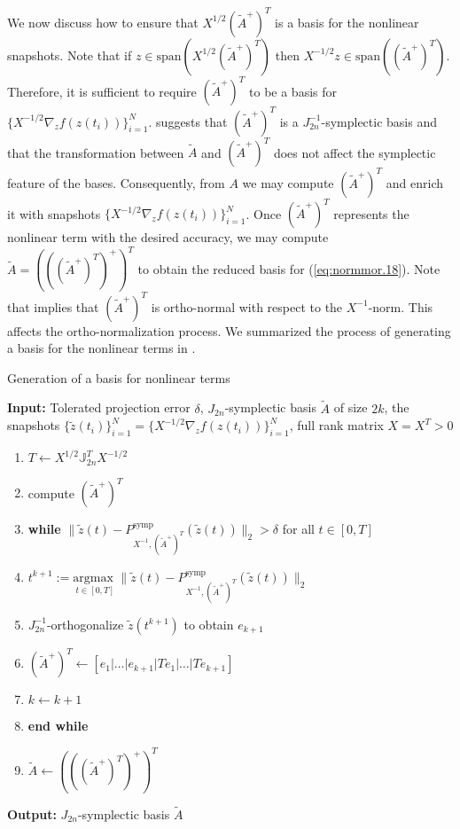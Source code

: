 We now discuss how to ensure that $X^{1/2} (\tilde A^+)^T$ is a basis for the nonlinear snapshots. Note that if $z \in \text{span}\left(X^{1/2} (\tilde A^+)^T\right)$ then $X^{-1/2} z \in \text{span}\left(( \tilde A^+)^T \right)$. Therefore, it is sufficient to require $(\tilde A^+)^T$ to be a basis for $\{X^{-1/2} \nabla_z f(z(t_i))\}_{i=1}^N$.  suggests that $(\tilde A^+)^T$ is a $J_{2n}^{-1}$-symplectic basis and that the transformation between $\tilde A$ and $(\tilde A^+)^T $ does not affect the symplectic feature of the bases. Consequently, from $A$ we may compute $(\tilde A^+)^T$ and enrich it with snapshots $\{X^{-1/2} \nabla_z f(z(t_i))\}_{i=1}^N$. Once $(\tilde A^+)^T$ represents the nonlinear term with the desired accuracy, we may compute $\tilde A= \left( \left( ( \tilde A^+ )^T \right)^+ \right)^T$ to obtain the reduced basis for (\ref{eq:normmor.18}). Note that  implies that $(\tilde A^+)^T$ is ortho-normal with respect to the $X^{-1}$-norm. This affects the ortho-normalization process. We summarized the process of generating a basis for the nonlinear terms in .

\begin{algorithm} 
\caption{Generation of a basis for nonlinear terms} \label{alg:3}
{\bf Input:} Tolerated projection error $\delta$, $J_{2n}$-symplectic basis $\tilde A$ of size $2k$, the snapshots $\{\tilde z(t_i)\}_{i=1}^{N} = \{X^{-1/2} \nabla_zf(z(t_i))\}_{i=1}^{N}$, full rank matrix $X=X^T>0$
\begin{enumerate}
\item $T \leftarrow X^{1/2}\mathbb J_{2n}^T X^{-1/2}$
\item compute $(\tilde A^+)^T$
\item \textbf{while} $\| \tilde z(t) - P^\text{symp}_{X^{-1},(\tilde A^+)^T}( \tilde z(t) ) \|_2 > \delta$ for all $t \in [0,T]$
\item \hspace{0.5cm} $t^{k+1} := \underset{t\in [0,T]}{\text{argmax }} \| \tilde z(t) - P^\text{symp}_{X^{-1},(\tilde A^+)^T}( \tilde z(t) ) \|_2$
\item \hspace{0.5cm} $J_{2n}^{-1}$-orthogonalize $ \tilde z(t^{k+1})$ to obtain $e_{k+1}$
\item \hspace{0.5cm} $(\tilde A^+)^T \leftarrow [e_1|\dots |e_{k+1} | Te_1|\dots| Te_{k+1}]$
\item \hspace{0.5cm} $k \leftarrow k+1$
\item \textbf{end while}
\item $\tilde A \leftarrow \left( \left( ( \tilde A^+ )^T \right)^+ \right)^T$
\end{enumerate}
\vspace{0.5cm}
{\bf Output:} $J_{2n}$-symplectic basis $\tilde A$
\end{algorithm}

